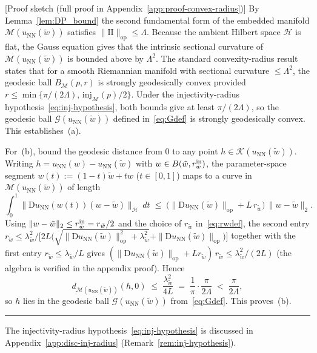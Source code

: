 \documentclass[twoside,11pt]{article}
\newcommand{\BlackBoxProof}{\rule{1.5ex}{1.5ex}}
\renewenvironment{proof}{\par\noindent{\bf Proof\ }}{\hfill\BlackBoxProof\par\medskip}
\newcommand{\rev}[1]{#1}                           %
\newcommand{\D}{\mathrm{D}}
\newcommand{\NN}{\mathrm{NN}}
\newcommand{\calG}{\mathcal{G}}
\newcommand{\calH}{\mathcal{H}}
\newcommand{\calK}{\mathcal{K}}
\newcommand{\calM}{\mathcal{M}}
\begin{document}
\rev{%
\begin{proof}[Proof sketch (full proof in Appendix~\ref{app:proof-convex-radius})]
By Lemma~\ref{lem:DP_bound} the second fundamental form of the embedded manifold $\calM(u_\NN(\tilde w))$ satisfies $\|\mathrm{II}\|_{\mathrm{op}} \le \Lambda$. Because the ambient Hilbert space $\calH$ is flat, the Gauss equation \citep[Theorem~1]{alexander2006gauss} gives that the intrinsic sectional curvature of $\calM(u_\NN(\tilde w))$ is bounded above by $\Lambda^2$. The standard convexity-radius result \citep[Theorem~5.14]{cheeger2008comparison} states that for a smooth Riemannian manifold with sectional curvature $\le \Lambda^2$, the geodesic ball $B_\calM(p,r)$ is strongly geodesically convex provided $r \le \min\{\pi/(2\Lambda),\,\mathrm{inj}_\calM(p)/2\}$. Under the injectivity-radius hypothesis~\eqref{eq:inj-hypothesis}, both bounds give at least $\pi/(2\Lambda)$, so the geodesic ball $\calG(u_\NN(\tilde w))$ defined in~\eqref{eq:Gdef} is strongly geodesically convex. This establishes~(a).

For~(b), bound the geodesic distance from $0$ to any point $h \in \calK(u_\NN(\tilde w))$. Writing $h = u_\NN(w) - u_\NN(\tilde w)$ with $w \in B(\tilde w, r^{\rm in}_{\tilde w})$, the parameter-space segment $w(t) := (1-t)\tilde w + tw$ ($t\in[0,1]$) maps to a curve in $\calM(u_\NN(\tilde w))$ of length
\[
    \int_0^1\!\|\D u_\NN(w(t))(w-\tilde w)\|_\calH\,dt \;\le\; \bigl(\|\D u_\NN(\tilde w)\|_{\mathrm{op}} + L\,r_{\tilde w}\bigr)\,\|w-\tilde w\|_2.
\]
Using $\|w-\tilde w\|_2 \le r^{\rm in}_{\tilde w} = r_{\tilde w}/2$ and the choice of $r_{\tilde w}$ in~\eqref{eq:rwdef}, the second entry $r_{\tilde w}\le \lambda_{\tilde w}^2/\bigl[2L\bigl(\sqrt{\|\D u_\NN(\tilde w)\|_{\mathrm{op}}^2+\lambda_{\tilde w}^2}+\|\D u_\NN(\tilde w)\|_{\mathrm{op}}\bigr)\bigr]$ together with the first entry $r_{\tilde w}\le \lambda_{\tilde w}/L$ gives $(\|\D u_\NN(\tilde w)\|_{\mathrm{op}} + L r_{\tilde w})\,r_{\tilde w} \le \lambda_{\tilde w}^2/(2L)$ (the algebra is verified in the appendix proof). Hence
\[
    d_{\calM(u_\NN(\tilde w))}(h, 0) \;\le\; \frac{\lambda_{\tilde w}^2}{4L} \;=\; \frac{1}{\pi}\cdot\frac{\pi}{2\Lambda} \;<\; \frac{\pi}{2\Lambda},
\]
so $h$ lies in the geodesic ball $\calG(u_\NN(\tilde w))$ from~\eqref{eq:Gdef}. This proves~(b).
\end{proof}
}

The injectivity-radius hypothesis~\eqref{eq:inj-hypothesis} is discussed in Appendix~\ref{app:disc-inj-radius} (Remark~\ref{rem:inj-hypothesis}).
\end{document}
